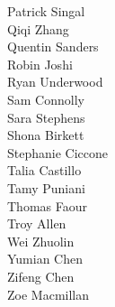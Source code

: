 \begin{multicols}{3}
\begin{center}
Patrick Singal\\
Qiqi Zhang\\
Quentin Sanders\\
\columnbreak
Robin Joshi\\
Ryan Underwood\\
Sam Connolly\\
Sara Stephens\\
Shona Birkett\\
Stephanie Ciccone\\
Talia Castillo\\
Tamy Puniani\\
Thomas Faour\\
Troy Allen\\
Wei Zhuolin\\
Yumian Chen\\
Zifeng Chen\\
Zoe Macmillan
\end{center}
\end{multicols}

